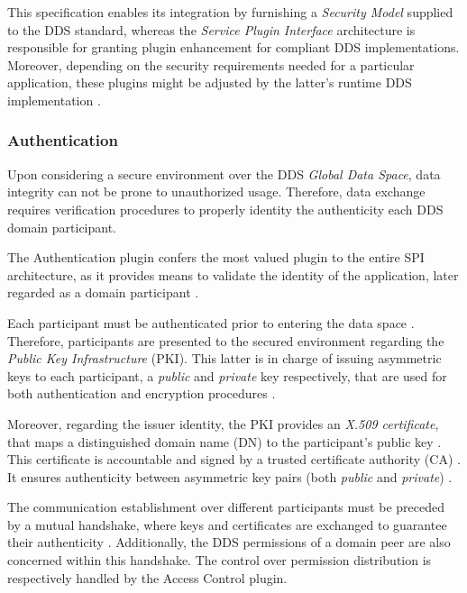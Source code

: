 This specification enables its integration by furnishing a \textit{Security Model} supplied to the DDS standard, whereas the \textit{Service Plugin Interface} architecture is responsible for granting plugin enhancement for compliant DDS implementations. Moreover, depending on the security requirements needed for a particular application, these plugins might be adjusted by the latter's runtime DDS implementation \cite{dds-s}.

\subsubsection{Authentication}

Upon considering a secure environment over the DDS \textit{Global Data Space}, data integrity can not be prone to unauthorized usage. Therefore, data exchange requires verification procedures to properly identity the authenticity each DDS domain participant.

The Authentication plugin confers the most valued plugin to the entire SPI architecture, as it provides means to validate the identity of the application, later regarded as a domain participant \cite{dds-s, ros-dds-integration}. 

Each participant must be authenticated prior to entering the data space \cite{white2019network}. Therefore, participants are presented to the secured environment regarding the \textit{Public Key Infrastructure} (PKI). This latter is in charge of issuing asymmetric keys to each participant, a \textit{public} and \textit{private} key respectively, that are used for both authentication and encryption procedures \cite{diluoffo2018robot, ros-dds-integration}. 

Moreover, regarding the issuer identity, the PKI provides an \textit{X.509 certificate}, that maps a distinguished domain name (DN) to the participant's public key \cite{diluoffo2018robot, white2016sros}. This certificate is accountable and signed by a trusted certificate authority (CA) \cite{white2019network, white2016sros, ros-dds-integration}. It ensures authenticity between asymmetric key pairs (both \textit{public} and \textit{private}) \cite{diluoffo2018robot}. 

The communication establishment over different participants must be preceded by a mutual handshake, where keys and certificates are exchanged to guarantee their authenticity \cite{white2019network, kim2018security}. Additionally, the DDS permissions of a domain peer are also concerned within this handshake. The control over permission distribution is respectively handled by the Access Control plugin.

